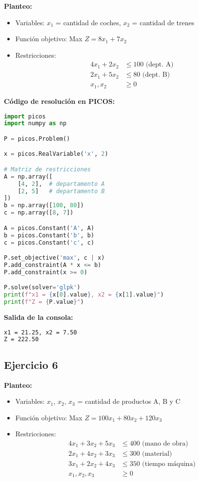 \documentclass[12pt]{article}
\begin{document}
\textbf{Planteo:}
\begin{itemize}
\item Variables: $x_1$ = cantidad de coches, $x_2$ = cantidad de trenes
\item Función objetivo: Max $Z = 8x_1 + 7x_2$
\item Restricciones:
  \begin{align*}
  4x_1 + 2x_2 &\leq 100 \text{ (dept. A)} \\
  2x_1 + 5x_2 &\leq 80 \text{ (dept. B)} \\
  x_1, x_2 &\geq 0
  \end{align*}
\end{itemize}

\textbf{Código de resolución en PICOS:}
\begin{lstlisting}[language=Python]
import picos
import numpy as np

P = picos.Problem()

x = picos.RealVariable('x', 2)

# Matriz de restricciones
A = np.array([
    [4, 2],  # departamento A
    [2, 5]   # departamento B
])
b = np.array([100, 80])
c = np.array([8, 7])

A = picos.Constant('A', A)
b = picos.Constant('b', b)
c = picos.Constant('c', c)

P.set_objective('max', c | x)
P.add_constraint(A * x <= b)
P.add_constraint(x >= 0)

P.solve(solver='glpk')
print(f"x1 = {x[0].value}, x2 = {x[1].value}")
print(f"Z = {P.value}")
\end{lstlisting}

\textbf{Salida de la consola:}
\begin{lstlisting}[language=bash,backgroundcolor=\color{black},basicstyle=\color{white}\ttfamily,numbers=none]
x1 = 21.25, x2 = 7.50
Z = 222.50
\end{lstlisting}

\subsection*{Ejercicio 6}

\textbf{Planteo:}
\begin{itemize}
\item Variables: $x_1$, $x_2$, $x_3$ = cantidad de productos A, B y C
\item Función objetivo: Max $Z = 100x_1 + 80x_2 + 120x_3$
\item Restricciones:
  \begin{align*}
  4x_1 + 3x_2 + 5x_3 &\leq 400 \text{ (mano de obra)} \\
  2x_1 + 4x_2 + 3x_3 &\leq 300 \text{ (material)} \\
  3x_1 + 2x_2 + 4x_3 &\leq 350 \text{ (tiempo máquina)} \\
  x_1, x_2, x_3 &\geq 0
  \end{align*}
\end{itemize}
\end{document}

